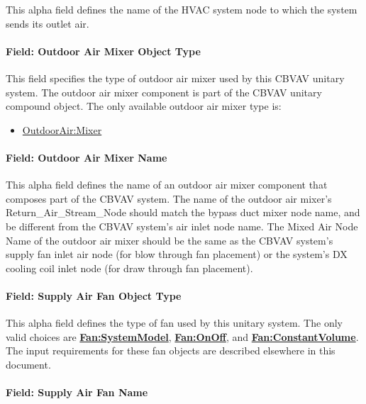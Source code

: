 This alpha field defines the name of the HVAC system node to which the system sends its outlet air.

\paragraph{Field: Outdoor Air Mixer Object Type}\label{field-outdoor-air-mixer-object-type}

This field specifies the type of outdoor air mixer used by this CBVAV unitary system. The outdoor air mixer component is part of the CBVAV unitary compound object. The only available outdoor air mixer type is:

\begin{itemize}
\tightlist
\item
  \hyperref[outdoorairmixer]{OutdoorAir:Mixer}
\end{itemize}

\paragraph{Field: Outdoor Air Mixer Name}\label{field-outdoor-air-mixer-name}

This alpha field defines the name of an outdoor air mixer component that composes part of the CBVAV system. The name of the outdoor air mixer's Return\_Air\_Stream\_Node should match the bypass duct mixer node name, and be different from the CBVAV system's air inlet node name. The Mixed Air Node Name of the outdoor air mixer should be the same as the CBVAV system's supply fan inlet air node (for blow through fan placement) or the system's DX cooling coil inlet node (for draw through fan placement).

\paragraph{Field: Supply Air Fan Object Type}\label{field-supply-air-fan-object-type-3}

This alpha field defines the type of fan used by this unitary system. The only valid choices are \textbf{\hyperref[fansystemmodel]{Fan:SystemModel}}, \textbf{\hyperref[fanonoff]{Fan:OnOff}}, and \textbf{\hyperref[fanconstantvolume]{Fan:ConstantVolume}}. The input requirements for these fan objects are described elsewhere in this document.

\paragraph{Field: Supply Air Fan Name}\label{field-supply-air-fan-name-3}

